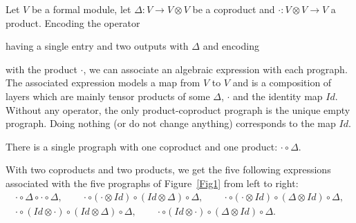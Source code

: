 \documentclass{amsart}
\begin{document}
Let $V$ be a formal module, let
$\Delta : V \rightarrow V \otimes V$ be a coproduct and
$\cdot : V \otimes V \rightarrow V$ a product. Encoding the operator
 having a single entry and two outputs with $\Delta$ and encoding
 with the product $\cdot$, we can associate
an algebraic expression with each prograph. The associated expression
models a map from $V$ to $V$ and is a composition of layers
which are mainly tensor products of some $\Delta$, $\cdot$ and
the identity map $Id$. Without any operator, the only product-coproduct prograph is the
unique empty prograph. Doing nothing (or do not change anything)
corresponds to the map $Id$.

There is a single prograph with one coproduct and one product: $\cdot \circ \Delta$.

With two coproducts and two products, we get the five following
expressions associated with the five prographs of Figure~\ref{Fig1} from
left to right:
\begin{equation}
  \begin{array}{c}
    \cdot \circ \Delta \circ \cdot \circ \Delta, \qquad
    \cdot \circ (\cdot \otimes Id) \circ (Id \otimes \Delta) \circ \Delta, \qquad 
    \cdot \circ (\cdot \otimes Id) \circ (\Delta \otimes Id) \circ \Delta, \\ 
    \cdot \circ (Id \otimes \cdot) \circ (Id \otimes \Delta) \circ \Delta, \qquad
    \cdot \circ (Id \otimes \cdot) \circ (\Delta \otimes Id) \circ \Delta.
    \end{array}
\end{equation}
\end{document}
